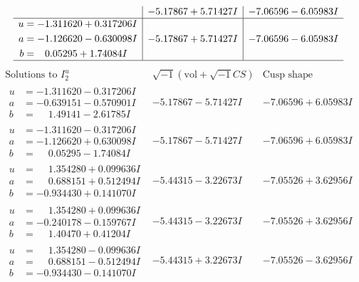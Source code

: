 \documentclass[1p]{elsarticle_modified}
\theoremstyle{definition}
\newcommand{\I}{\sqrt{-1}}
\begin{document}
$$\begin{array}{c|c|c}
 & -5.17867 + 5.71427 I & -7.06596 - 6.05983 I \\ \hline\begin{aligned}
u &= -1.311620 + 0.317206 I \\
a &= -1.126620 - 0.630098 I \\
b &= \phantom{-}0.05295 + 1.74084 I\end{aligned}
 & -5.17867 + 5.71427 I & -7.06596 - 6.05983 I\\
 \hline 
 \end{array}$$\newpage$$\begin{array}{c|c|c}  
\text{Solutions to }I^u_{2}& \I (\text{vol} + \sqrt{-1}CS) & \text{Cusp shape}\\
 \hline 
\begin{aligned}
u &= -1.311620 - 0.317206 I \\
a &= -0.639151 - 0.570901 I \\
b &= \phantom{-}1.49141 - 2.61785 I\end{aligned}
 & -5.17867 - 5.71427 I & -7.06596 + 6.05983 I \\ \hline\begin{aligned}
u &= -1.311620 - 0.317206 I \\
a &= -1.126620 + 0.630098 I \\
b &= \phantom{-}0.05295 - 1.74084 I\end{aligned}
 & -5.17867 - 5.71427 I & -7.06596 + 6.05983 I \\ \hline\begin{aligned}
u &= \phantom{-}1.354280 + 0.099636 I \\
a &= \phantom{-}0.688151 + 0.512494 I \\
b &= -0.934430 + 0.141070 I\end{aligned}
 & -5.44315 - 3.22673 I & -7.05526 + 3.62956 I \\ \hline\begin{aligned}
u &= \phantom{-}1.354280 + 0.099636 I \\
a &= -0.240178 - 0.159767 I \\
b &= \phantom{-}1.40470 + 0.41204 I\end{aligned}
 & -5.44315 - 3.22673 I & -7.05526 + 3.62956 I \\ \hline\begin{aligned}
u &= \phantom{-}1.354280 - 0.099636 I \\
a &= \phantom{-}0.688151 - 0.512494 I \\
b &= -0.934430 - 0.141070 I\end{aligned}
 & -5.44315 + 3.22673 I & -7.05526 - 3.62956 I \\ \hline\begin{aligned}

\end{aligned}
\end{array}$$
\end{document}
